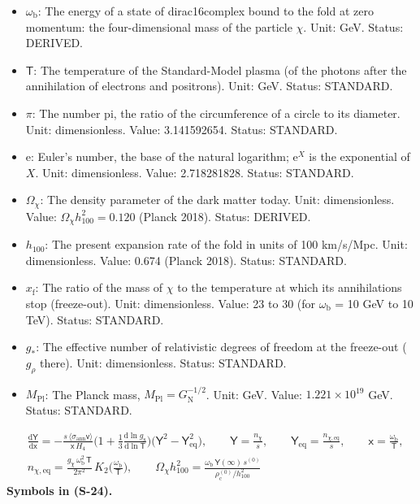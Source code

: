 \documentclass[
  10pt,
]{article}
\begin{document}
\begin{itemize}
  DERIVED.
\item
  \(\omega_{\mathrm{b}}\): The energy of a state of dirac16complex bound
  to the fold at zero momentum: the four-dimensional mass of the
  particle \(\chi\). Unit: GeV. Status: DERIVED.
\item
  \(\mathsf{T}\): The temperature of the Standard-Model plasma (of the
  photons after the annihilation of electrons and positrons). Unit: GeV.
  Status: STANDARD.
\item
  \(\pi\): The number pi, the ratio of the circumference of a circle to
  its diameter. Unit: dimensionless. Value: 3.141592654. Status:
  STANDARD.
\item
  \(\mathrm{e}\): Euler's number, the base of the natural logarithm;
  \(\mathrm{e}^{X}\) is the exponential of \(X\). Unit: dimensionless.
  Value: 2.718281828. Status: STANDARD.
\item
  \(\Omega_\chi\): The density parameter of the dark matter today. Unit:
  dimensionless. Value: \(\Omega_\chi h_{100}^2 = 0.120\) (Planck 2018).
  Status: DERIVED.
\item
  \(h_{100}\): The present expansion rate of the fold in units of 100
  km/s/Mpc. Unit: dimensionless. Value: 0.674 (Planck 2018). Status:
  STANDARD.
\item
  \(x_{\mathrm{f}}\): The ratio of the mass of \(\chi\) to the
  temperature at which its annihilations stop (freeze-out). Unit:
  dimensionless. Value: 23 to 30 (for \(\omega_{\mathrm{b}}\) = 10 GeV
  to 10 TeV). Status: STANDARD.
\item
  \(g_*\): The effective number of relativistic degrees of freedom at
  the freeze-out (\(g_\rho\) there). Unit: dimensionless. Status:
  STANDARD.
\item
  \(M_{\mathrm{Pl}}\): The Planck mass,
  \(M_{\mathrm{Pl}} = G_{\mathrm{N}}^{-1/2}\). Unit: GeV. Value:
  \(1.221\times10^{19}\) GeV. Status: STANDARD.
\end{itemize}

\[
\begin{aligned}
&\frac{\mathrm{d}\mathsf{Y}}{\mathrm{d}\mathsf{x}} = -\frac{s\,\langle\sigma_{\mathrm{ann}}\mathsf{v}\rangle}{\mathsf{x}\,H_4}\Big(1 + \frac13\frac{\mathrm{d}\ln g_{\mathrm{s}}}{\mathrm{d}\ln\mathsf{T}}\Big)
 \big(\mathsf{Y}^2 - \mathsf{Y}_{\mathrm{eq}}^2\big),\qquad \mathsf{Y} = \frac{n_\chi}{s},\qquad \mathsf{Y}_{\mathrm{eq}} = \frac{n_{\chi,\mathrm{eq}}}{s},\qquad \mathsf{x} = \frac{\omega_{\mathrm{b}}}{\mathsf{T}},\\
&n_{\chi,\mathrm{eq}} = \frac{g_\chi\,\omega_{\mathrm{b}}^2\,\mathsf{T}}{2\pi^2}\,K_2\Big(\frac{\omega_{\mathrm{b}}}{\mathsf{T}}\Big),\qquad
 \Omega_\chi h_{100}^2 = \frac{\omega_{\mathrm{b}}\,\mathsf{Y}(\infty)\,s^{(0)}}{\rho_{\mathrm{c}}^{(0)}/h_{100}^2}
\end{aligned} \tag{S-24}
\] \textbf{Symbols in (S-24).}
\end{document}
